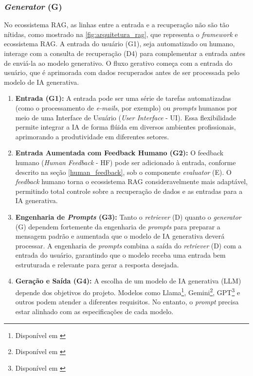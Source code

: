 \documentclass[a4paper, 12pt]{article}
\newcommand{\citeb}[1]{\bibleftbracket\cite{#1}\bibrightbracket}
\begin{document}
    \subsubsection{\textit{Generator} (G)}

    No ecossistema RAG, as linhas entre a entrada e a recuperação não são tão nítidas, como mostrado na \ref{fig:arquitetura_rag}, que representa o \textit{framework} e ecossistema RAG. A entrada do usuário (G1), seja automatizado ou humano, interage com a consulta de recuperação (D4) para complementar a entrada antes de enviá-la ao modelo generativo. O fluxo gerativo começa com a entrada do usuário, que é aprimorada com dados recuperados antes de ser processada pelo modelo de IA generativa.

    \begin{enumerate}
        \item \textbf{Entrada (G1):} A entrada pode ser uma série de tarefas automatizadas (como o processamento de \textit{e-mails}, por exemplo) ou \textit{prompts} humanos por meio de uma Interface de Usuário (\textit{User Interface} - UI). Essa flexibilidade permite integrar a IA de forma flúida em diversos ambientes profissionais, aprimorando a produtividade em diferentes setores.
        \item \textbf{Entrada Aumentada com Feedback Humano (G2):} O feedback humano (\textit{Human Feedback} - HF) pode ser adicionado à entrada, conforme descrito na seção \ref{human_feedback}, sob o componente \textit{evaluator} (E). O \textit{feedback} humano torna o ecossistema RAG consideravelmente mais adaptável, permitindo total controle sobre a recuperação de dados e as entradas para a IA generativa.
        \item \textbf{Engenharia de \textit{Prompts} (G3):} Tanto o \textit{retriever} (D) quanto o \textit{generator} (G) dependem fortemente da engenharia de \textit{prompts} para preparar a mensagem padrão e aumentada que o modelo de IA generativa deverá processar. A engenharia de \textit{prompts} combina a saída do \textit{retriever} (D) com a entrada do usuário, garantindo que o modelo receba uma entrada bem estruturada e relevante para gerar a resposta desejada.
        \item \textbf{Geração e Saída (G4):} A escolha de um modelo de IA generativa (LLM) depende dos objetivos do projeto. Modelos como Llama\footnote{Disponível em \citeb{llama_models}}, Gemini\footnote{Disponível em \citeb{gemini_models}}, GPT\footnote{Disponível em \citeb{gpt_models}} e outros podem atender a diferentes requisitos. No entanto, o \textit{prompt} precisa estar alinhado com as especificações de cada modelo.
    \end{enumerate}
\end{document}
